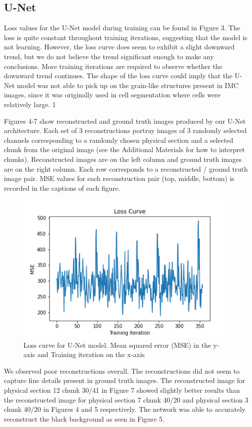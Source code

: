 \documentclass[10pt,twocolumn,letterpaper]{article}
\begin{document}
\subsection{U-Net}
Loss values for the U-Net model during training can be found in Figure 3. The loss is quite constant throughout training iterations, suggesting that the model is not learning. However, the loss curve does seem to exhibit a slight downward trend, but we do not believe the trend significant enough to make any conclusions. More training iterations are required to observe whether the downward trend continues. The shape of the loss curve could imply that the U-Net model was not able to pick up on the grain-like structures present in IMC images, since it was originally used in cell segmentation where cells were relatively large. 1

Figures 4-7 show reconstructed and ground truth images produced by our U-Net architecture. Each set of 3 reconstructions portray images of 3 randomly selected channels corresponding to a randomly chosen physical section and a selected chunk from the original image (see the Additional Materials for how to interpret chunks). Reconstructed images are on the left column and ground truth images are on the right column. Each row corresponds to a reconstructed / ground truth image pair. MSE values for each reconstruction pair (top, middle, bottom) is recorded in the captions of each figure.  

\begin{figure}
	\centering
	\captionsetup{justification=centering}
		\includegraphics[scale=0.5]{../figures/unet_loss_curve.png}
	\caption{Loss curve for U-Net model. Mean squared error (MSE) in the y-axis and Training iteration on the x-axis}		
\end{figure}

We observed poor reconstructions overall. The reconstructions did not seem to capture fine details present in ground truth images. The reconstructed image for physical section 12 chunk 30/41 in Figure 7 showed slightly better results than the reconstructed image for physical section 7 chunk 40/20 and physical section 3 chunk 40/20 in Figures 4 and 5 respectively. The network was able to accurately reconstruct the black background as seen in Figure 5.
\end{document}
